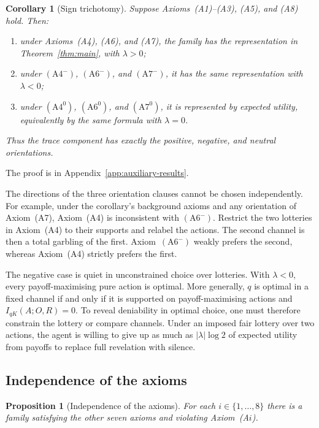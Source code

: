 \documentclass[11pt,a4paper]{article}
\newtheorem{proposition}[theorem]{Proposition}
\newtheorem{corollary}[theorem]{Corollary}
\theoremstyle{definition}
\newcommand{\I}{I}
\newcommand{\1}{\mathbf 1}
\begin{document}
\begin{corollary}[Sign trichotomy]\label{cor:signduality}
Suppose Axioms~\textup{(A1)--(A3)}, \textup{(A5)}, and
\textup{(A8)} hold.  Then:
\begin{enumerate}[label=\textup{(\roman*)},leftmargin=*]
\item under Axioms~\textup{(A4)}, \textup{(A6)}, and \textup{(A7)}, the family has the representation in
Theorem~\ref{thm:main}, with $\lambda>0$;
\item under $(\mathrm{A}4^-)$, $(\mathrm{A}6^-)$, and $(\mathrm{A}7^-)$, it has the same representation with
$\lambda<0$;
\item under $(\mathrm{A}4^0)$, $(\mathrm{A}6^0)$, and $(\mathrm{A}7^0)$, it is represented by expected utility,
equivalently by the same formula with $\lambda=0$.
\end{enumerate}
Thus the trace component has exactly the positive, negative, and neutral orientations.
\end{corollary}

The proof is in Appendix~\ref{app:auxiliary-results}.

The directions of the three orientation clauses cannot be chosen independently.  For example, under the
corollary's background axioms and any orientation of Axiom~\textup{(A7)}, Axiom~\textup{(A4)} is inconsistent
with $(\mathrm{A}6^-)$.  Restrict the two lotteries in Axiom~\textup{(A4)} to their supports and relabel the
actions.  The second channel is then a total garbling of the first.  Axiom~$(\mathrm{A}6^-)$ weakly prefers the
second, whereas Axiom~\textup{(A4)} strictly prefers the first.

The negative case is quiet in unconstrained choice over lotteries.  With $\lambda<0$, every payoff-maximising
pure action is optimal.  More generally, $q$ is optimal in a fixed channel if and only if it is supported on
payoff-maximising actions and $\I_{qK}(A;O,R)=0$.  To reveal deniability in optimal choice, one must therefore
constrain the lottery or compare channels.  Under an imposed fair lottery over two actions, the agent is willing
to give up as much as $|\lambda|\log2$ of expected utility from payoffs to replace full revelation with silence.

\subsection{Independence of the axioms}

\begin{proposition}[Independence of the axioms]\label{prop:independence}
For each $i\in\{1,\ldots,8\}$ there is a family satisfying the other seven axioms and violating
Axiom~\textup{(A$i$)}.
\end{proposition}
\end{document}
